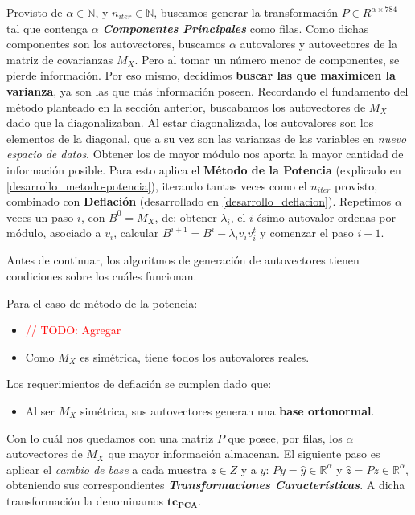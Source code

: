 Provisto de $\alpha \in \mathbb{N}$, y $n_{iter} \in \mathbb{N}$, buscamos generar la transformaci\'on $P \in R^{\alpha \times 784}$ tal que contenga $\alpha$ \textbf{\textit{Componentes Principales}} como filas.
Como dichas componentes son los autovectores, buscamos $\alpha$ autovalores y autovectores de la matriz de covarianzas $M_{X}$. Pero al tomar un n\'umero menor de componentes, se pierde informaci\'on. Por eso mismo, decidimos \textbf{buscar las que maximicen la varianza}, ya son las que m\'as informaci\'on poseen. Recordando el fundamento del m\'etodo planteado en la secci\'on anterior, buscabamos los autovectores de $M_{X}$ dado que la diagonalizaban. Al estar diagonalizada, los autovalores son los elementos de la diagonal, que a su vez son las varianzas de las variables en \textit{nuevo espacio de datos}. Obtener los de mayor m\'odulo nos aporta la mayor cantidad de informaci\'on posible. Para esto aplica el \textbf{M\'etodo de la Potencia} (explicado en \ref{desarrollo_metodo-potencia}), iterando tantas veces como el $n_{iter}$ provisto, combinado con \textbf{Deflaci\'on} (desarrollado en \ref{desarrollo_deflacion}). Repetimos $\alpha$ veces un paso $i$, con $B^0 = M_{X}$, de: obtener $\lambda_{i}$, el $i$-\'esimo autovalor ordenas por m\'odulo, asociado a $v_{i}$, calcular $B^{i + 1} = B^{i} - \lambda_{i}v_{i}v_{i}^{t}$ y comenzar el paso $i+1$.

Antes de continuar, los algoritmos de generaci\'on de autovectores tienen condiciones sobre los cu\'ales funcionan.

Para el caso de m\'etodo de la potencia:

\begin{itemize}
\item \textcolor{red}{// TODO: Agregar}
\item Como $M_{X}$ es sim\'etrica, tiene todos los autovalores reales.
\end{itemize}

Los requerimientos de deflaci\'on se cumplen dado que:

\begin{itemize}
\item Al ser $M_{X}$ sim\'etrica, sus autovectores generan una \textbf{base ortonormal}.
\end{itemize}

Con lo cu\'al nos quedamos con una matriz $P$ que posee, por filas, los $\alpha$ autovectores de $M_{X}$ que mayor informaci\'on almacenan. El siguiente paso es aplicar el \textit{cambio de base} a cada muestra $z \in Z$ y a $y$: $Py = \hat{y} \in \mathbb{R}^{\alpha}$ y $\hat{z} = Pz \in \mathbb{R}^{\alpha}$, obteniendo sus correspondientes \textit{\textbf{Transformaciones Caracter\'isticas}}. A dicha transformaci\'on la denominamos $\mathbf{tc_{PCA}}$.

